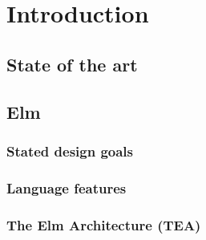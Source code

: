 \chapter{Introduction}
\setcounter{page}{1}

\section{State of the art}
\section{Elm}
\subsection{Stated design goals}
\subsection{Language features}
\subsection{The Elm Architecture (TEA)}
